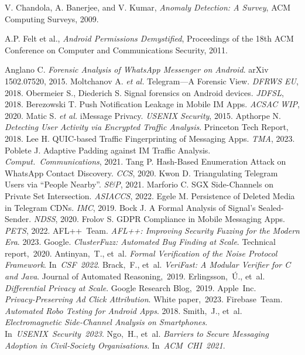 \documentclass[a4paper,12pt]{report}
\begin{document}
\begin{thebibliography}{99}
V. Chandola, A. Banerjee, and V. Kumar, \textit{Anomaly Detection: A Survey}, ACM Computing Surveys, 2009.

A.P. Felt et al., \textit{Android Permissions Demystified}, Proceedings of the 18th ACM Conference on Computer and Communications Security, 2011.

     Anglano C. \textit{Forensic Analysis of WhatsApp Messenger on Android}. arXiv 1502.07520, 2015.
 Moltchanov A. \emph{et al.} Telegram—A Forensic View. \textit{DFRWS EU}, 2018.
 Obermeier S., Diederich S. Signal forensics on Android devices. \textit{JDFSL}, 2018.
 Berezowski T. Push Notification Leakage in Mobile IM Apps. \textit{ACSAC WIP}, 2020.
 Matic S. \emph{et al.} iMessage Privacy. \textit{USENIX Security}, 2015.
 Apthorpe N. \textit{Detecting User Activity via Encrypted Traffic Analysis}. Princeton Tech Report, 2018.
 Lee H. QUIC-based Traffic Fingerprinting of Messaging Apps. \textit{TMA}, 2023.
 Poblete J. Adaptive Padding against IM Traffic Analysis. \textit{Comput.\ Communications}, 2021.
 Tang P. Hash-Based Enumeration Attack on WhatsApp Contact Discovery. \textit{CCS}, 2020.
 Kwon D. Triangulating Telegram Users via “People Nearby”. \textit{S\&P}, 2021.
 Marforio C. SGX Side-Channels on Private Set Intersection. \textit{ASIACCS}, 2022.
 Egele M. Persistence of Deleted Media in Telegram CDNs. \textit{IMC}, 2019.
 Bock J. A Formal Analysis of Signal’s Sealed-Sender. \textit{NDSS}, 2020.
 Frolov S. GDPR Compliance in Mobile Messaging Apps. \textit{PETS}, 2022.
 AFL++ Team. \emph{AFL++: Improving Security Fuzzing for the Modern Era}. 2023.
 Google. \emph{ClusterFuzz: Automated Bug Finding at Scale}. Technical report, 2020.
 Antinyan, T., et al. \emph{Formal Verification of the Noise Protocol Framework}. In \textit{CSF 2022}.
 Brack, F., et al. \emph{VeriFast: A Modular Verifier for C and Java}. Journal of Automated Reasoning, 2019.
 Erlingsson, Ú., et al. \emph{Differential Privacy at Scale}. Google Research Blog, 2019.
 Apple Inc. \emph{Privacy‑Preserving Ad Click Attribution}. White paper, 2023.
 Firebase Team. \emph{Automated Robo Testing for Android Apps}. 2018.
 Smith, J., et al. \emph{Electromagnetic Side‑Channel Analysis on Smartphones}. In \textit{USENIX Security 2023}.
 Ngo, H., et al. \emph{Barriers to Secure Messaging Adoption in Civil‑Society Organisations}. In \textit{ACM CHI 2021}.
\end{thebibliography}
\clearpage
\end{document}
